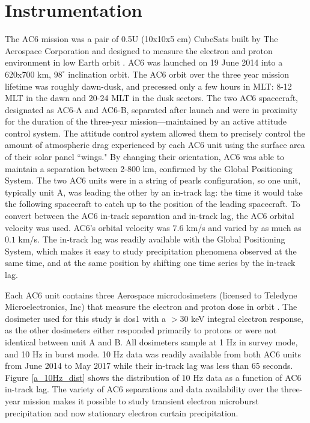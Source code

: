 \documentclass[draft]{agujournal2019}
\begin{document}
\section{Instrumentation} \label{instrumentation}
The AC6 mission was a pair of 0.5U (10x10x5 cm) CubeSats built by The Aerospace Corporation and designed to measure the electron and proton environment in low Earth orbit \cite{O'brien2016}. AC6 was launched on 19 June 2014 into a 620x700 km, $98^\circ$ inclination orbit. The AC6 orbit over the three year mission lifetime was roughly dawn-dusk, and precessed only a few hours in MLT: 8-12 MLT in the dawn and 20-24 MLT in the dusk sectors. The two AC6 spacecraft, designated as AC6-A and AC6-B, separated after launch and were in proximity for the duration of the three-year mission---maintained by an active attitude control system. The attitude control system allowed them to precisely control the amount of atmospheric drag experienced by each AC6 unit using the surface area of their solar panel ``wings." By changing their orientation, AC6 was able to maintain a separation between 2-800 km, confirmed by the Global Positioning System. The two AC6 units were in a string of pearls configuration, so one unit, typically unit A, was leading the other by an in-track lag: the time it would take the following spacecraft to catch up to the position of the leading spacecraft. To convert between the AC6 in-track separation and in-track lag, the AC6 orbital velocity was used. AC6's orbital velocity was $7.6$ km/s and varied by as much as $0.1$ km/s. The in-track lag was readily available with the Global Positioning System, which makes it easy to study precipitation phenomena observed at the same time, and at the same position by shifting one time series by the in-track lag.

Each AC6 unit contains three Aerospace microdosimeters (licensed to Teledyne Microelectronics, Inc) that measure the electron and proton dose in orbit \cite{O'brien2016}. The dosimeter used for this study is dos1 with a $> 30$ keV integral electron response, as the other dosimeters either responded primarily to protons or were not identical between unit A and B. All dosimeters sample at 1 Hz in survey mode, and 10 Hz in burst mode. 10 Hz data was readily available from both AC6 units from June 2014 to May 2017 while their in-track lag was less than 65 seconds. Figure \ref{a_10Hz_dist} shows the distribution of 10 Hz data as a function of AC6 in-track lag. The variety of AC6 separations and data availability over the three-year mission makes it possible to study transient electron microburst precipitation \cite{Shumko2020} and now stationary electron curtain precipitation.
\end{document}
